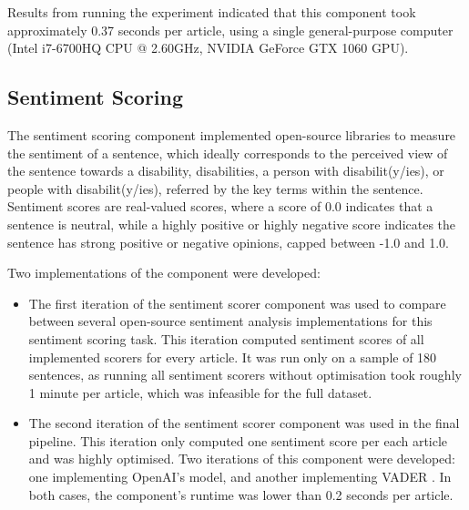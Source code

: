\documentclass{report}
\newcommand{\textapprox}{\raisebox{0.5ex}{\texttildelow}}  %
\begin{document}
Results from running the experiment indicated that this component took approximately 0.37 seconds per article, using a single general-purpose computer (Intel i7-6700HQ CPU @ 2.60GHz, NVIDIA GeForce GTX 1060 GPU).

\subsection{Sentiment Scoring} \label{des-sentiment}

The sentiment scoring component implemented open-source libraries to measure the sentiment of a sentence, which ideally corresponds to the perceived view of the sentence towards a disability, disabilities, a person with disabilit(y/ies), or people with disabilit(y/ies), referred by the key terms within the sentence.
Sentiment scores are real-valued scores, where a score of 0.0 indicates that a sentence is neutral, while a highly positive or highly negative score indicates the sentence has strong positive or negative opinions, capped between -1.0 and 1.0.

Two implementations of the component were developed: 
\begin{itemize}
	\item The first iteration of the sentiment scorer component was used to compare between several open-source sentiment analysis implementations for this sentiment scoring task.
		This iteration computed sentiment scores of all implemented scorers for every article. 
		It was run only on a sample of 180 sentences, as running all sentiment scorers without optimisation took roughly \textapprox1 minute per article, which was infeasible for the full dataset.
	\item The second iteration of the sentiment scorer component was used in the final pipeline.
		This iteration only computed one sentiment score per each article and was highly optimised.
		Two iterations of this component were developed: one implementing OpenAI's \cite{OpenAI} model, and another implementing VADER \cite{VADER}.
		In both cases, the component's runtime was lower than 0.2 seconds per article.
\end{itemize}
\end{document}
